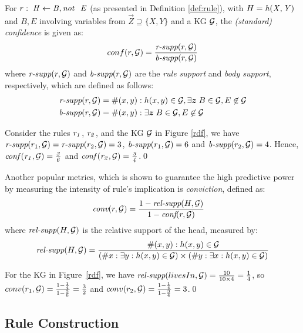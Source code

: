 For $r:\;\mi{H\leftarrow B, \naf\ E}$ (as presented in Definition \ref{def:rule}), with $H=\mathit{h(X,Y)}$ and $B,E$ involving variables from $\vec{Z}\supseteq \{X,Y\}$ and a KG $\mathcal{G}$, the \emph{(standard) confidence} is given as:
\begin{align*}
conf(r,\mathcal{G})= \frac{\textit{r-supp}(r,\mathcal{G})}{\textit{b-supp}(r,\mathcal{G})}
\end{align*}
where $\textit{r-supp}(r,\mathcal{G})$ and $\textit{b-supp}(r ,\mathcal{G})$ are the \textit{rule support} and \textit{body support}, respectively, which are defined as follows:
\begin{align*}
\textit{r-supp}(r,\cG) &= \#(x,y): h(x,y) \in \cG, \exists \vec{z}\;B\in \cG,E \not \in \cG\\
\textit{b-supp}(r,\cG) &= \#(x,y):\exists \vec{z}\; B\in \cG, E \not \in \cG
\end{align*}
\begin{example}
Consider the rules $\mathit{r_1}$, $\mathit{r_2}$, and the KG $\mathcal{G}$ in Figure \ref{rdf}, we have $\textit{r-supp}(r_1,\mathcal{G}) = \textit{r-supp}(r_2,\mathcal{G}) = 3$, $\textit{b-supp}(r_1,\mathcal{G}) = 6$ and $\textit{b-supp}(r_2,\mathcal{G}) = 4$.
Hence, $\mathit{conf(r_1,\mathcal{G}) = \frac{3}{6}}$ and $\mathit{conf(r_2,\mathcal{G}) = \frac{3}{4}}$.\qed
\end{example}

Another popular metrics, which is shown to guarantee the high predictive power \cite{Azevedo2007} by measuring the intensity of rule's implication \cite{metrics-summary} is \emph{conviction}, defined as:
\begin{align*}
\textit{conv}(r,\mathcal{G}) & = \frac{1 - \textit{rel-supp}(H, \mathcal{G})}{1-\textit{conf}(r,\mathcal{G})}
\end{align*}
where $\textit{rel-supp}(H, \mathcal{G})$ is the relative support of the head, measured by:
\begin{align*}
\textit{rel-supp}(H, \mathcal{G}) = \dfrac{\#(x,y):h(x,y)\in \mathcal{G}}{(\#x:\exists y:h(x,y)\in \mathcal{G})\times(\#y:\exists x:h(x,y)\in \mathcal{G})}
\end{align*}
\begin{example}
For the KG in Figure~\ref{rdf}, we have $\textit{rel-supp}(livesIn, \mathcal{G}) = \frac{10}{10 \times 4} = \frac{1}{4}$, so $conv(r_1,\mathcal{G}) = \frac{1-\frac{1}{4}}{1-\frac{3}{6}} = \frac{3}{2}$ and $conv(r_2,\mathcal{G}) = \frac{1-\frac{1}{4}}{1-\frac{3}{4}} = 3$.\qed
\end{example}

\subsection{Rule Construction}
\label{subsec:rule_const}

